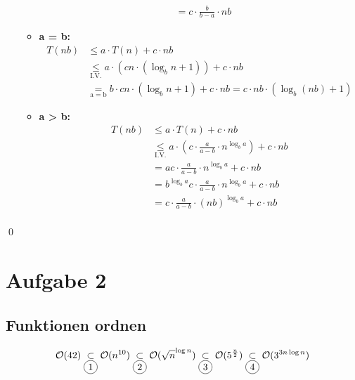 \begin{itemize}
\begin{itemize}
\begin{equation*}
\begin{align}
				&= c \cdot \frac{b}{b - a} \cdot nb
			\end{align}
		\end{equation*}
		\item \textbf{a = b:}
		\begin{equation*}
			\begin{align}
				T(nb) &\le a \cdot T(n) + c \cdot nb\\
				&\underset{\mathrm{I.V.}}{\le} a \cdot (cn \cdot (\log_{b}{n} + 1)) + c \cdot nb\\
				&\underset{\mathrm{a = b}}{=} b \cdot cn \cdot (\log_b{n} + 1) + c \cdot nb = c \cdot nb \cdot (\log_b{(nb)} + 1)
			\end{align}
		\end{equation*}
		\item \textbf{a > b:}
		\begin{equation*}
			\begin{align}
				T(nb) &\le a \cdot T(n) + c \cdot nb\\
				&\underset{\mathrm{I.V.}}{\le} a \cdot (c \cdot \frac{a}{a - b} \cdot n^{\log_b{a}}) + c \cdot nb\\
				&= ac \cdot \frac{a}{a - b} \cdot n^{\log_b{a}} + c \cdot nb\\
				&= b^{\log_b{a}}c \cdot \frac{a}{a - b} \cdot n^{\log_b{a}} + c \cdot nb\\
				&= c \cdot \frac{a}{a - b} \cdot (nb)^{\log_b{a}} + c \cdot nb\\
			\end{align}
		\end{equation*}
	\end{itemize}
\end{itemize}

\qed

\section*{Aufgabe 2}

\subsection{Funktionen ordnen}

\begin{equation*}
	\mathcal{O}(42) \underset{\mathrm{\circled{1}}}{\subset}
	\mathcal{O}(n^{10}) \underset{\mathrm{\circled{2}}}{\subset}
	\mathcal{O}(\sqrt{n}^{\log{n}}) \underset{\mathrm{\circled{3}}}{\subset}
	\mathcal{O}(5^{\frac{n}{2}}) \underset{\mathrm{\circled{4}}}{\subset}
	\mathcal{O}(3^{3n\log{n}})
\end{equation*}

